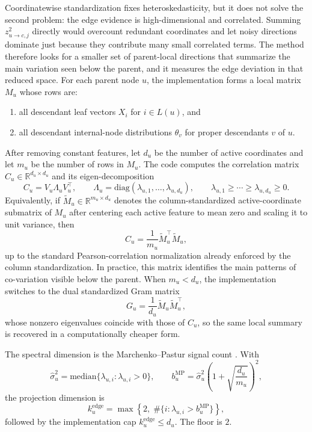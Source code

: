 Coordinatewise standardization fixes heteroskedasticity, but it does not solve
the second problem: the edge evidence is high-dimensional and correlated.
Summing $z_{u \to c,j}^2$ directly would overcount redundant coordinates and let
noisy directions dominate just because they contribute many small correlated
terms. The method therefore looks for a smaller set of parent-local directions
that summarize the main variation seen below the parent, and it measures the
edge deviation in that reduced space. For each parent node $u$, the
implementation forms a local matrix $M_u$ whose rows are:
\begin{enumerate}[leftmargin=1.5em]
  \item all descendant leaf vectors $X_i$ for $i \in L(u)$, and
  \item all descendant internal-node distributions $\theta_v$ for proper
  descendants $v$ of $u$.
\end{enumerate}
After removing constant features, let $d_u$ be the number of active
coordinates and let $m_u$ be the number of rows in $M_u$. The code computes the correlation matrix
$C_u \in \mathbb{R}^{d_u \times d_u}$ and its eigen-decomposition
\begin{equation}
C_u = V_u \Lambda_u V_u^\top,
\qquad
\Lambda_u = \mathrm{diag}(\lambda_{u,1},\dots,\lambda_{u,d_u}),
\qquad
\lambda_{u,1} \ge \cdots \ge \lambda_{u,d_u} \ge 0.
\end{equation}
Equivalently, if $\widetilde{M}_u \in \mathbb{R}^{m_u \times d_u}$ denotes the
column-standardized active-coordinate submatrix of $M_u$ after centering each
active feature to mean zero and scaling it to unit variance, then
\begin{equation}
C_u = \frac{1}{m_u}\widetilde{M}_u^\top \widetilde{M}_u,
\end{equation}
up to the standard Pearson-correlation normalization already enforced by the
column standardization. In practice, this matrix identifies the main patterns
of co-variation visible below the parent. When $m_u < d_u$, the implementation
switches to the dual standardized Gram matrix
\begin{equation}
G_u = \frac{1}{d_u}\widetilde{M}_u \widetilde{M}_u^\top,
\end{equation}
whose nonzero eigenvalues coincide with those of $C_u$, so the same local
summary is recovered in a computationally cheaper form.

The spectral dimension is the Marchenko--Pastur signal count
\citep{marchenko1967distribution}. With
\begin{equation}
\hat{\sigma}_u^2 = \mathrm{median}\{\lambda_{u,i} : \lambda_{u,i} > 0\},
\qquad
b_u^{\mathrm{MP}} = \hat{\sigma}_u^2 \left(1 + \sqrt{\frac{d_u}{m_u}}\right)^2,
\end{equation}
the projection dimension is
\begin{equation}
k_u^{\mathrm{edge}}
=
\max\left\{
2,\;
\#\{i : \lambda_{u,i} > b_u^{\mathrm{MP}}\}
\right\},
\end{equation}
followed by the implementation cap $k_u^{\mathrm{edge}} \le d_u$. The floor is
$2$.

